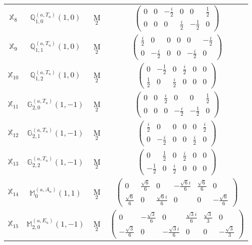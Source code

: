 \documentclass[fleqn,10pt,landscape]{article}
\begin{document}
\begin{itemize}
\begin{center}
\begin{longtable}{c|c|c|c}
$ \mathbb{X}_{8} $ & $\mathbb{Q}_{1,0}^{(a,T_{u})}(1,0)$ & M$_{2}$ & $\begin{pmatrix} 0 & 0 & - \frac{i}{2} & 0 & 0 & \frac{1}{2} \\ 0 & 0 & 0 & \frac{i}{2} & - \frac{1}{2} & 0 \end{pmatrix}$ \\
$ \mathbb{X}_{9} $ & $\mathbb{Q}_{1,1}^{(a,T_{u})}(1,0)$ & M$_{2}$ & $\begin{pmatrix} \frac{i}{2} & 0 & 0 & 0 & 0 & - \frac{i}{2} \\ 0 & - \frac{i}{2} & 0 & 0 & - \frac{i}{2} & 0 \end{pmatrix}$ \\
$ \mathbb{X}_{10} $ & $\mathbb{Q}_{1,2}^{(a,T_{u})}(1,0)$ & M$_{2}$ & $\begin{pmatrix} 0 & - \frac{1}{2} & 0 & \frac{i}{2} & 0 & 0 \\ \frac{1}{2} & 0 & \frac{i}{2} & 0 & 0 & 0 \end{pmatrix}$ \\
$ \mathbb{X}_{11} $ & $\mathbb{G}_{2,0}^{(a,T_{u})}(1,-1)$ & M$_{2}$ & $\begin{pmatrix} 0 & 0 & \frac{i}{2} & 0 & 0 & \frac{1}{2} \\ 0 & 0 & 0 & - \frac{i}{2} & - \frac{1}{2} & 0 \end{pmatrix}$ \\
$ \mathbb{X}_{12} $ & $\mathbb{G}_{2,1}^{(a,T_{u})}(1,-1)$ & M$_{2}$ & $\begin{pmatrix} \frac{i}{2} & 0 & 0 & 0 & 0 & \frac{i}{2} \\ 0 & - \frac{i}{2} & 0 & 0 & \frac{i}{2} & 0 \end{pmatrix}$ \\
$ \mathbb{X}_{13} $ & $\mathbb{G}_{2,2}^{(a,T_{u})}(1,-1)$ & M$_{2}$ & $\begin{pmatrix} 0 & \frac{1}{2} & 0 & \frac{i}{2} & 0 & 0 \\ - \frac{1}{2} & 0 & \frac{i}{2} & 0 & 0 & 0 \end{pmatrix}$ \\
$ \mathbb{X}_{14} $ & $\mathbb{M}_{0}^{(a,A_{u})}(1,1)$ & M$_{2}$ & $\begin{pmatrix} 0 & \frac{\sqrt{6}}{6} & 0 & - \frac{\sqrt{6} i}{6} & \frac{\sqrt{6}}{6} & 0 \\ \frac{\sqrt{6}}{6} & 0 & \frac{\sqrt{6} i}{6} & 0 & 0 & - \frac{\sqrt{6}}{6} \end{pmatrix}$ \\
$ \mathbb{X}_{15} $ & $\mathbb{M}_{2,0}^{(a,E_{u})}(1,-1)$ & M$_{2}$ & $\begin{pmatrix} 0 & - \frac{\sqrt{3}}{6} & 0 & \frac{\sqrt{3} i}{6} & \frac{\sqrt{3}}{3} & 0 \\ - \frac{\sqrt{3}}{6} & 0 & - \frac{\sqrt{3} i}{6} & 0 & 0 & - \frac{\sqrt{3}}{3} \end{pmatrix}$ \\

\end{longtable}
\end{center}
\end{itemize}
\end{document}
